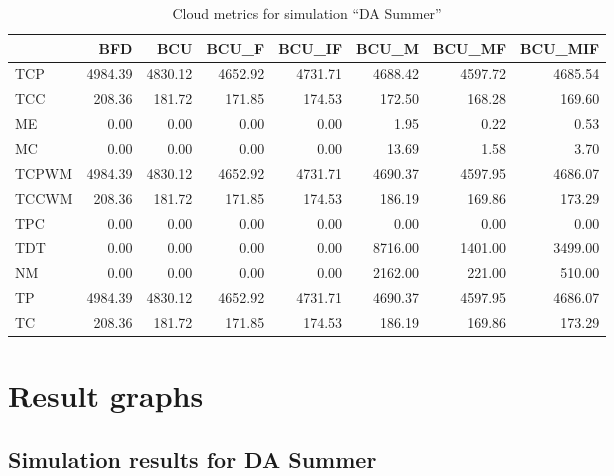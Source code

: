 \begin{table}[ht]
\centering
\begin{tabular}{lrrrrrrr}
\toprule
{} &      BFD &      BCU &    BCU\_F &   BCU\_IF &    BCU\_M &   BCU\_MF &  BCU\_MIF \\
\midrule
TCP   &  4984.39 &  4830.12 &  4652.92 &  4731.71 &  4688.42 &  4597.72 &  4685.54 \\
TCC   &   208.36 &   181.72 &   171.85 &   174.53 &   172.50 &   168.28 &   169.60 \\
ME    &     0.00 &     0.00 &     0.00 &     0.00 &     1.95 &     0.22 &     0.53 \\
MC    &     0.00 &     0.00 &     0.00 &     0.00 &    13.69 &     1.58 &     3.70 \\
TCPWM &  4984.39 &  4830.12 &  4652.92 &  4731.71 &  4690.37 &  4597.95 &  4686.07 \\
TCCWM &   208.36 &   181.72 &   171.85 &   174.53 &   186.19 &   169.86 &   173.29 \\
TPC   &     0.00 &     0.00 &     0.00 &     0.00 &     0.00 &     0.00 &     0.00 \\
TDT   &     0.00 &     0.00 &     0.00 &     0.00 &  8716.00 &  1401.00 &  3499.00 \\
NM    &     0.00 &     0.00 &     0.00 &     0.00 &  2162.00 &   221.00 &   510.00 \\
TP    &  4984.39 &  4830.12 &  4652.92 &  4731.71 &  4690.37 &  4597.95 &  4686.07 \\
TC    &   208.36 &   181.72 &   171.85 &   174.53 &   186.19 &   169.86 &   173.29 \\
\bottomrule
\end{tabular}
\caption{Cloud metrics for simulation "`DA Summer"'}
\end{table}



\FloatBarrier
\section{Result graphs} \label{sec:app_result_simulation_graphs}


\subsection{Simulation results for DA Summer}

\newpage

